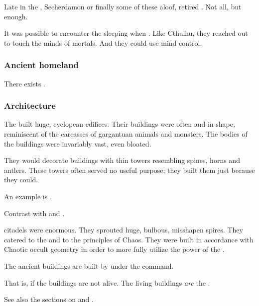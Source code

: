 Late in the \thirdbanewar, Secherdamon or \Ishnaruchaefir finally  some of these aloof, retired \dragons.
Not all, but enough.

It was possible to encounter the sleeping \dragons when .
Like Cthulhu, they reached out to touch the minds of mortals.
And they could use mind control.





\subsubsection{Ancient homeland}
There exists .





\subsubsection{Architecture}
The \dragons{} built huge, cyclopean edifices. 
Their buildings were often  and  in shape, reminiscent of the carcasses of gargantuan animals and monsters. 
The bodies of the buildings were invariably vast, even bloated. 

They would decorate buildings with thin towers resembling spines, horns and antlers. 
These towers often served no useful purpose; they built them just because they could. 

An example is . 

Contrast with  and . 

\Draconian citadels were enormous. 
They sprouted huge, bulbous, misshapen spires.
They catered to the \xss and to the principles of Chaos. 
They were built in accordance with Chaotic occult geometry in order to more fully utilize the power of the \xss. 

The ancient \draconic{} buildings are built by \daemons{} under the \psp{\dragons} command. 

That is, if the buildings are not alive. The living buildings \emph{are} the \daemons.

See also the sections on  and . 





